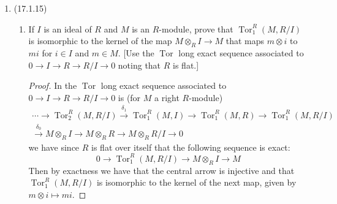 \documentclass[11pt]{article}
\DeclareMathOperator{\Tor}{Tor}
\DeclareMathOperator{\Hom}{Hom}
\DeclareMathOperator{\Ext}{Ext}
\begin{document}
\begin{enumerate}
\begin{proof}
        Then with $D = \Hom_{\mathbb{Z}/m\mathbb{Z}}(A,\mathbb{Z}/m\mathbb{Z})$, we have that $\Ext_{\mathbb{Z}/m\mathbb{Z}}^0(A,\mathbb{Z}/d\mathbb{Z}) \cong \Hom_{\mathbb{Z}/m\mathbb{Z}}(A,\mathbb{Z}/d\mathbb{Z})$. We have also that $\Ext_{\mathbb{Z}/m\mathbb{Z}}^n(A,\mathbb{Z}/d\mathbb{Z})$ is isomorphic to ${}_{m/d}D/dD$ for $n$ odd and to ${}_dD/(m/d)D$ for even $n$. With $m=p^2$, $d=p$, and $A = \mathbb{Z}/p\mathbb{Z}$ we have with $D = \Hom_{\mathbb{Z}/p^2\mathbb{Z}}(\mathbb{Z}/p\mathbb{Z},\mathbb{Z}/p^2\mathbb{Z})\cong \mathbb{Z}/p\mathbb{Z}$. [The elements of $D$ are determined by the value on $[1]$, and $[p]\mapsto [0]$ so that if $f[1] = [a]$ we must have $a = kp$ for some integer $k$, by which we can make the aforementioned identification (there are only $p$ choices of $[a]$).] Then the $p$-torsion of $D$ is $D$ itself and $pD= 0$. Thus by the previous result we have $\Ext_{\mathbb{Z}/p^2\mathbb{Z}}^n(\mathbb{Z}/p\mathbb{Z},\mathbb{Z}/p\mathbb{Z})\cong \mathbb{Z}/p\mathbb{Z}$ for $n\geq 1$. We have also that $\Ext_{\mathbb{Z}/p^2\mathbb{Z}}^0(\mathbb{Z}/p\mathbb{Z},\mathbb{Z}/p\mathbb{Z})\cong \Hom_{\mathbb{Z}/p^2\mathbb{Z}}(\mathbb{Z}/p\mathbb{Z},\mathbb{Z}/p\mathbb{Z})\cong\mathbb{Z}/p\mathbb{Z}$ as needed.
    \end{proof}
    \item (17.1.15)\begin{enumerate}
        \item If $I$ is an ideal of $R$ and $M$ is an $R$-module, prove that $\Tor_1^R(M,R/I)$ is isomorphic to the kernel of the map $M\otimes_R I\to M$ that maps $m\otimes i$ to $mi$ for $i\in I$ and $m\in M$. [Use the $\Tor$ long exact sequence associated to $0\to I\to R \to R/I\to 0$ noting that $R$ is flat.] \begin{proof}
            In the $\Tor$ long exact sequence associated to $0\to I\to R \to R/I\to 0$ is (for $M$ a right $R$-module) \begin{multline*}
            \cdots\to\Tor_2^R(M,R/I)\xrightarrow{\delta_1}\Tor_1^R(M,I)\to\Tor_1^R(M,R)\to\Tor_1^R(M,R/I)\\\xrightarrow{\delta_0}M\otimes_RI\to M\otimes_R R \to M\otimes_R R/I\to 0
            \end{multline*} we have since $R$ is flat over itself that the following sequence is exact: \[0\to \Tor_1^R(M,R/I)\to M\otimes_RI\to M \] 
            Then by exactness we have that the central arrow is injective and that $\Tor_1^R(M,R/I)$ is isomorphic to the kernel of the next map, given by $m\otimes i\mapsto mi$.   
        \end{proof}

\end{enumerate}
\end{enumerate}
\end{document}
